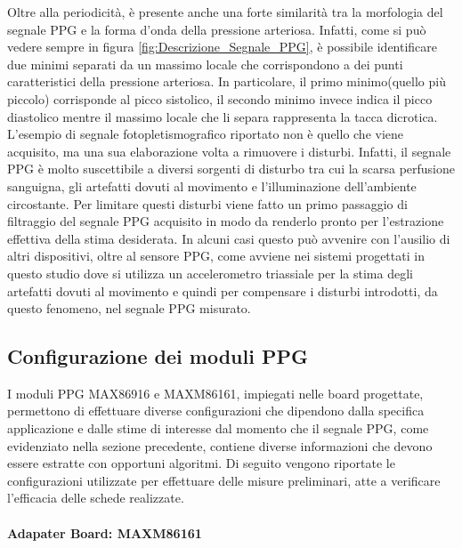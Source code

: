 Oltre alla periodicità, è presente anche una forte similarità tra la morfologia del segnale PPG e la forma d'onda della pressione arteriosa. Infatti, come si può vedere sempre in figura \ref{fig:Descrizione_Segnale_PPG}, è possibile identificare due minimi separati da un massimo locale che corrispondono a dei punti caratteristici della pressione arteriosa. In particolare, il primo minimo(quello più piccolo) corrisponde al picco sistolico, il secondo minimo invece indica il picco diastolico mentre il massimo locale che li separa rappresenta la tacca dicrotica. 
L'esempio di segnale fotopletismografico riportato non è quello che viene acquisito, ma una sua elaborazione volta a rimuovere i disturbi. Infatti, il segnale PPG è molto suscettibile a diversi sorgenti di disturbo tra cui la scarsa perfusione sanguigna, gli artefatti dovuti al movimento e l'illuminazione dell'ambiente circostante. Per limitare questi disturbi viene fatto un primo passaggio di filtraggio del segnale PPG acquisito in modo da renderlo pronto per l'estrazione effettiva della stima desiderata. In alcuni casi questo può avvenire con l'ausilio di altri dispositivi, oltre al sensore PPG, come avviene nei sistemi progettati in questo studio dove si utilizza un accelerometro triassiale per la stima degli artefatti dovuti al movimento e quindi per compensare i disturbi introdotti, da questo fenomeno, nel segnale PPG misurato.
\subsection{Configurazione dei moduli PPG}
I moduli PPG MAX86916 e MAXM86161, impiegati nelle board progettate, permettono di effettuare diverse configurazioni che dipendono dalla specifica applicazione e dalle stime di interesse dal momento che il segnale PPG, come evidenziato nella sezione precedente, contiene diverse informazioni che devono essere estratte con opportuni algoritmi. Di seguito vengono riportate le configurazioni utilizzate per effettuare delle misure preliminari, atte a verificare l'efficacia delle schede realizzate.
\paragraph{Adapater Board: MAXM86161}
